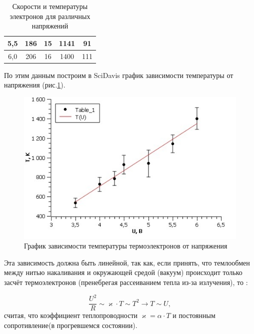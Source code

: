 \begin{itemize}
\begin{table}[!ht]
\begin{tabular}{|c|c|c|c|c|}
5,5             & 186             & 15                                                                       & 1141             & 91                                                                      \\ \hline
6,0               & 206             & 16                                                                       & 1400             & 111                                                                      \\ \hline
\end{tabular}
\caption{Скорости и температуры электронов для различных напряжений}
\label{tab:result}
\end{table}

    По этим данным построим в SciDavis график зависимости температуры от напряжения (рис.\ref{fig:result}).
    
    \begin{figure}[h!p]
    \centering
    \includegraphics[scale=1.2]{result.jpg}
    \caption{График зависимости температуры термоэлектронов от напряжения}
    \label{fig:result}
    \end{figure}

    Эта зависимость должна быть линейной, так как, если принять, что темлообмен между нитью накаливания и окружающей средой (вакуум) происходит только засчёт термоэлектронов (пренебрегая рассеиванием тепла из-за излучения), то :

    \begin{equation}
        \frac{U^2}{R} \sim \varkappa \cdot T \sim T^2 \rightarrow T \sim U,
    \end{equation}
    считая, что коэффициент теплопроводности $\varkappa = \alpha \cdot T$ и постоянным сопротивление(в прогревшемся состоянии). 

\end{itemize}

